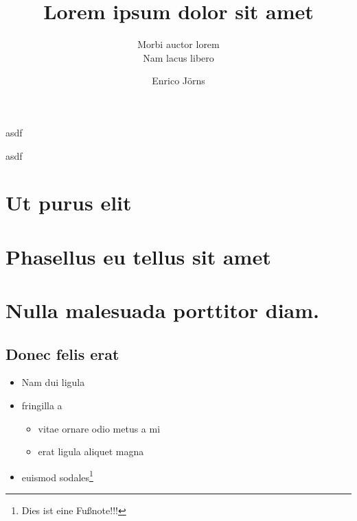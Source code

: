 \documentclass[a4paper,extramargin,violet,sender=bottom]{tubsartcl}
\title{Lorem ipsum dolor sit amet}
\subtitle{Morbi auctor lorem\vphantom{g}\\ %
Nam lacus libero}
\author{Enrico Jörns}
\begin{document}
\maketitle[image,logo=outside]
\makebackpage
\pagestyle{scrheadings}
\tableofcontents

\begin{gausspage}
  \showtubslogo[right]
  \showdesignhelper
  \begin{segment}[bgcolor=tuSecondaryLight]{2}
    asdf
  \end{segment}
\end{gausspage}

\begin{gausspage}
  \showtubslogo[right]
  \showdesignhelper
  \begin{segment}[bgcolor=tuSecondaryLight]{2}
    asdf
  \end{segment}
\end{gausspage}

\section{Ut purus elit}

\lipsum[1]

% 

\section{Phasellus eu tellus sit amet}

\lipsum[2-5]

\section{Nulla malesuada porttitor diam.}

\lipsum[1-3]

\subsection{Donec felis erat}

\lipsum[4-7]

\begin{itemize}
  \item Nam dui ligula
  \item fringilla a
    \begin{itemize}
      \item vitae ornare odio metus a mi
      \item erat ligula aliquet magna
    \end{itemize}
  \item euismod sodales\footnote{Dies ist eine Fußnote!!!}
\end{itemize}
\end{document}
